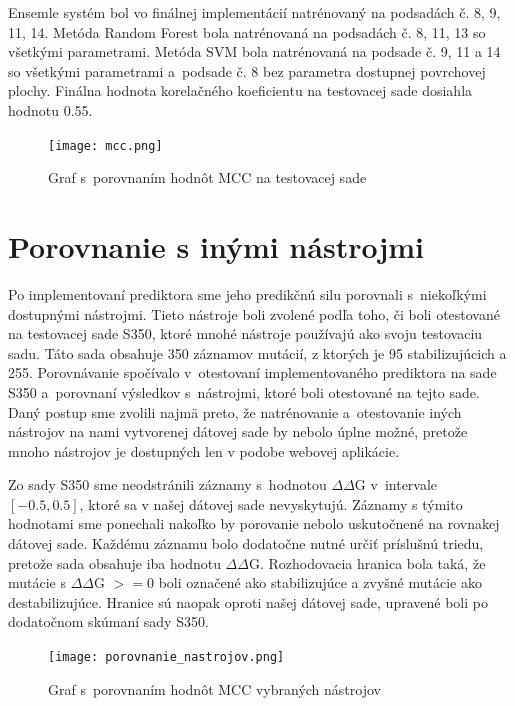 Ensemle systém bol vo finálnej implementácií natrénovaný na podsadách č. 8, 9, 11, 14. Metóda Random Forest bola natrénovaná na podsadách č. 8, 11, 13 so všetkými parametrami. Metóda SVM bola natrénovaná na podsade č. 9, 11 a 14 so všetkými parametrami a~podsade č. 8 bez parametra dostupnej povrchovej plochy. Finálna hodnota korelačného koeficientu na testovacej sade dosiahla hodnotu 0.55. 

\begin{figure}[H]
	\centering
	\begin{center}
		\scalebox{0.7}
		{   
			\texttt{[image: mcc.png]}
		}
		\caption{Graf s~porovnaním hodnôt MCC na testovacej sade}
	\end{center}
\end{figure}

\section{Porovnanie s inými nástrojmi}

Po implementovaní prediktora sme jeho predikčnú silu porovnali s~niekoľkými dostupnými nástrojmi. Tieto nástroje boli zvolené podľa toho, či boli otestované na testovacej sade S350, ktoré mnohé nástroje používajú ako svoju testovaciu sadu. Táto sada obsahuje 350 záznamov mutácií, z ktorých je 95 stabilizujúcich a 255. 
Porovnávanie spočívalo v~otestovaní implementovaného prediktora na sade S350 a~porovnaní výsledkov s~nástrojmi, ktoré boli otestované na tejto sade. Daný postup sme zvolili najmä preto, že natrénovanie a~otestovanie iných nástrojov na nami vytvorenej dátovej sade by nebolo úplne možné, pretože mnoho nástrojov je dostupných len v podobe webovej aplikácie.

Zo sady S350 sme neodstránili záznamy s~hodnotou $\Delta\Delta$G v~intervale $\left[-0.5,0.5\right]$, ktoré sa v našej dátovej sade nevyskytujú. Záznamy s týmito hodnotami sme ponechali nakoľko by porovanie nebolo uskutočnené na rovnakej dátovej sade. Každému záznamu bolo dodatočne nutné určiť príslušnú triedu, pretože sada obsahuje iba hodnotu $\Delta\Delta$G. Rozhodovacia hranica bola taká, že mutácie s $\Delta\Delta$G $>= 0$ boli označené ako stabilizujúce a zvyšné mutácie ako destabilizujúce. Hranice sú naopak oproti našej dátovej sade, upravené boli po dodatočnom skúmaní sady S350. 


\begin{figure}[H]
	\centering
	\begin{center}
		\scalebox{0.7}
		{   
			\texttt{[image: porovnanie\_nastrojov.png]}
		}
		\caption{Graf s~porovnaním hodnôt MCC vybraných nástrojov}
		\label{porovnanie}
	\end{center}
\end{figure}

